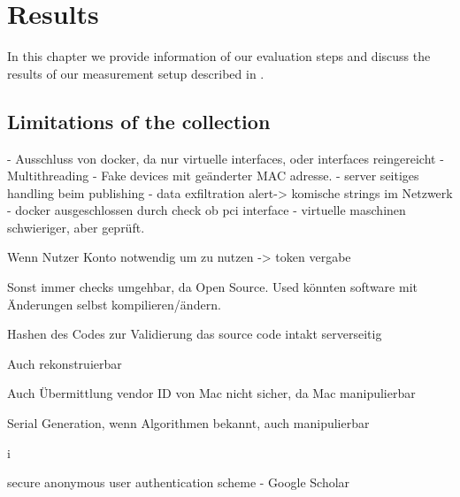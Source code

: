 \chapter{Results}
\label{chap:results}
In this chapter we provide information of our evaluation steps and discuss the results of our measurement setup described in .\\

\section{Limitations of the collection}
\label{sec:measurement:robust}
%

- Ausschluss von docker, da nur virtuelle interfaces, oder interfaces reingereicht
- Multithreading
- Fake devices mit geänderter MAC adresse.
- server seitiges handling beim publishing
- data exfiltration alert-> komische strings im Netzwerk
- docker ausgeschlossen durch check ob pci interface
- virtuelle maschinen schwieriger, aber geprüft.


Wenn Nutzer Konto notwendig um zu nutzen -> token vergabe

Sonst immer checks umgehbar, da Open Source. Used könnten software mit Änderungen selbst kompilieren/ändern.

Hashen des Codes zur Validierung das source code intakt serverseitig

Auch rekonstruierbar

Auch Übermittlung vendor ID von Mac nicht sicher, da Mac manipulierbar

Serial Generation, wenn Algorithmen bekannt, auch manipulierbar

i%

secure anonymous user authentication scheme - Google Scholar


